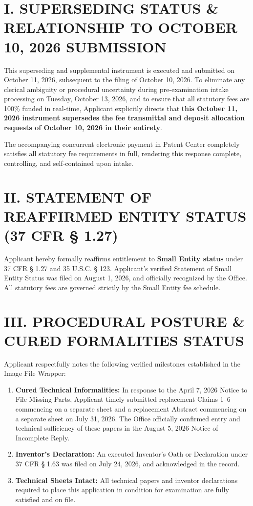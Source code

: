 \documentclass[11pt,letterpaper]{article}
\begin{document}
\section*{I. SUPERSEDING STATUS \& RELATIONSHIP TO OCTOBER 10, 2026 SUBMISSION}

This superseding and supplemental instrument is executed and submitted on October 11, 2026, subsequent to the filing of October 10, 2026. To eliminate any clerical ambiguity or procedural uncertainty during pre-examination intake processing on Tuesday, October 13, 2026, and to ensure that all statutory fees are 100\% funded in real-time, Applicant explicitly directs that \textbf{this October 11, 2026 instrument supersedes the fee transmittal and deposit allocation requests of October 10, 2026 in their entirety}. 

The accompanying concurrent electronic payment in Patent Center completely satisfies all statutory fee requirements in full, rendering this response complete, controlling, and self-contained upon intake.

\section*{II. STATEMENT OF REAFFIRMED ENTITY STATUS (37 CFR \S{} 1.27)}

Applicant hereby formally reaffirms entitlement to \textbf{Small Entity status} under 37 CFR \S{} 1.27 and 35 U.S.C. \S{} 123. Applicant's verified Statement of Small Entity Status was filed on August 1, 2026, and officially recognized by the Office. All statutory fees are governed strictly by the Small Entity fee schedule.

\section*{III. PROCEDURAL POSTURE \& CURED FORMALITIES STATUS}

Applicant respectfully notes the following verified milestones established in the Image File Wrapper:
\begin{enumerate}[leftmargin=*]
    \item \textbf{Cured Technical Informalities:} In response to the April 7, 2026 Notice to File Missing Parts, Applicant timely submitted replacement Claims 1--6 commencing on a separate sheet and a replacement Abstract commencing on a separate sheet on July 31, 2026. The Office officially confirmed entry and technical sufficiency of these papers in the August 5, 2026 Notice of Incomplete Reply.
    \item \textbf{Inventor's Declaration:} An executed Inventor's Oath or Declaration under 37 CFR \S{} 1.63 was filed on July 24, 2026, and acknowledged in the record.
    \item \textbf{Technical Sheets Intact:} All technical papers and inventor declarations required to place this application in condition for examination are fully satisfied and on file.
\end{enumerate}
\end{document}

